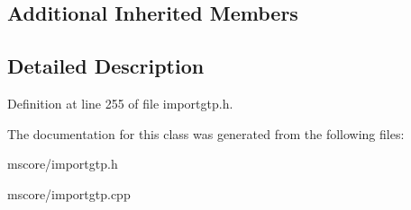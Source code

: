 \subsection*{Additional Inherited Members}


\subsection{Detailed Description}


Definition at line 255 of file importgtp.\+h.



The documentation for this class was generated from the following files\+:\begin{DoxyCompactItemize}
\item 
mscore/importgtp.\+h\item 
mscore/importgtp.\+cpp\end{DoxyCompactItemize}
